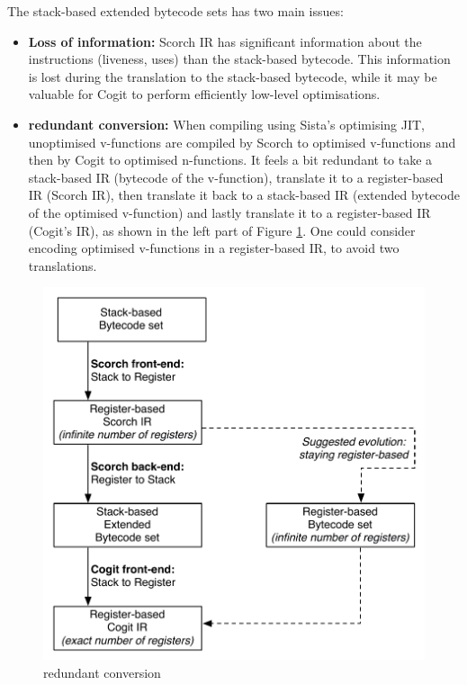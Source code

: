 \documentclass[a4paper,12pt,twoside]{../includes/ThesisStyle}
\begin{document}
The stack-based extended bytecode sets has two main issues:
\begin{itemize}
	\item \textbf{Loss of information:} Scorch IR has significant information about the instructions (liveness, uses) than the stack-based bytecode. This information is lost during the translation to the stack-based bytecode, while it may be valuable for Cogit to perform efficiently low-level optimisations.
	\item \textbf{redundant conversion:} When compiling using Sista's optimising JIT, unoptimised v-functions are compiled by Scorch to optimised v-functions and then by Cogit to optimised n-functions. It feels a bit redundant to take a stack-based IR (bytecode of the v-function), translate it to a register-based IR (Scorch IR), then translate it back to a stack-based IR (extended bytecode of the optimised v-function) and lastly translate it to a register-based IR (Cogit's IR), as shown in the left part of Figure \ref{fig:FutureWorkredundant}. One could consider encoding optimised v-functions in a register-based IR, to avoid two translations.
\end{itemize}

\begin{figure}[h!]
    \begin{center}
        \includegraphics[width=0.7\linewidth]{FutureWorkredondant}
        \caption{redundant conversion}
        \label{fig:FutureWorkredundant}
    \end{center}
\end{figure}
\end{document}
